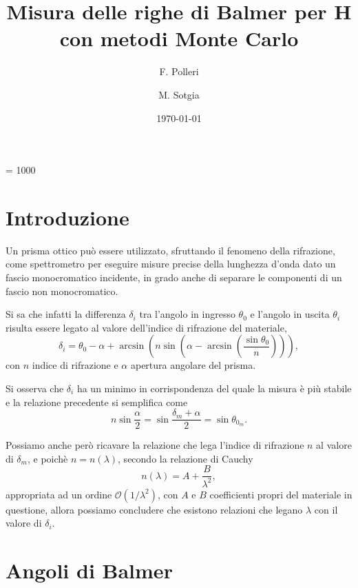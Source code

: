 \documentclass[a4paper,preprintnumbers,showkeys,aps,citeautoscript,notitlepage]{revtex4-2}
\begin{document}
\count\footins = 1000
\title{Misura delle righe di Balmer per H con metodi Monte Carlo}
\author{F. Polleri}
\author{M. Sotgia}
\date{\today}
\maketitle

\section{Introduzione}
Un prisma ottico può essere utilizzato, sfruttando il fenomeno della rifrazione, come spettrometro per eseguire misure precise della lunghezza d'onda dato un fascio monocromatico incidente, in grado anche di separare le componenti di un fascio non monocromatico. 

Si sa che infatti la differenza $\delta_i$ tra l'angolo in ingresso $\theta_0$ e l'angolo in uscita $\theta_i$ risulta essere legato al valore dell'indice di rifrazione del materiale, \begin{equation}\delta_i = \theta_0 - \alpha+\arcsin\left(n\sin\left(\alpha - \arcsin\left(\frac{\sin\theta_0}{n}\right)\right)\right),\end{equation} con $n$ indice di rifrazione e $\alpha$ apertura angolare del prisma. 

Si osserva che $\delta_i$ ha un minimo in corrispondenza del quale la misura è più stabile e la relazione precedente si semplifica come \begin{equation} n\sin\frac{\alpha}{2} = \sin\frac{\delta_m + \alpha}{2} = \sin\theta_{0_m}.\end{equation}

Possiamo anche però ricavare la relazione che lega l'indice di rifrazione $n$ al valore di $\delta_m$, e poichè $n=n(\lambda)$, secondo la relazione di Cauchy \begin{equation} n(\lambda) = A + \frac{B}{\lambda^2},\end{equation} appropriata ad un ordine $\mathcal O (1/\lambda^2)$, con $A$ e $B$ coefficienti propri del materiale in questione, allora possiamo concludere che esistono relazioni che legano $\lambda$ con il valore di $\delta_i$. 

\section{Angoli di Balmer}
\end{document}

